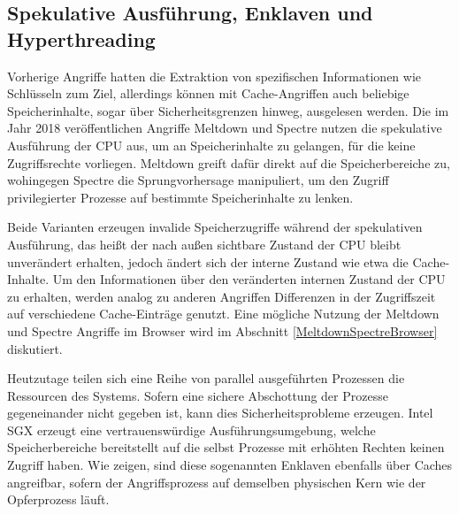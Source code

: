 

\subsection{Spekulative Ausführung, Enklaven und Hyperthreading}


Vorherige Angriffe hatten die Extraktion von spezifischen Informationen wie Schlüsseln zum Ziel, allerdings können mit Cache-Angriffen auch beliebige Speicherinhalte, sogar über Sicherheitsgrenzen hinweg, ausgelesen werden.
Die im Jahr 2018 veröffentlichen Angriffe Meltdown \cite{MeltdownPaper} und Spectre \cite{SpectrePaper} nutzen die spekulative Ausführung der CPU aus, um an Speicherinhalte zu gelangen, für die keine Zugriffsrechte vorliegen.
Meltdown greift dafür direkt auf die Speicherbereiche zu, wohingegen Spectre die Sprungvorhersage manipuliert, um den Zugriff privilegierter Prozesse auf bestimmte Speicherinhalte zu lenken.

Beide Varianten erzeugen invalide Speicherzugriffe während der spekulativen Ausführung, das heißt der nach außen sichtbare Zustand der CPU bleibt unverändert erhalten, jedoch ändert sich der interne Zustand wie etwa die Cache-Inhalte.
Um den Informationen über den veränderten internen Zustand der CPU zu erhalten, werden analog zu anderen Angriffen Differenzen in der Zugriffszeit auf verschiedene Cache-Einträge genutzt.
Eine mögliche Nutzung der Meltdown und Spectre Angriffe im Browser wird im Abschnitt \ref{MeltdownSpectreBrowser} diskutiert.

Heutzutage teilen sich eine Reihe von parallel ausgeführten Prozessen die Ressourcen des Systems.
Sofern eine sichere Abschottung der Prozesse gegeneinander nicht gegeben ist, kann dies Sicherheitsprobleme erzeugen.
Intel SGX erzeugt eine vertrauenswürdige Ausführungsumgebung, welche Speicherbereiche bereitstellt auf die selbst Prozesse mit erhöhten Rechten keinen Zugriff haben.
Wie \cite{CacheZoom,CacheAttacksIntelSGX} zeigen, sind diese sogenannten Enklaven ebenfalls über Caches angreifbar, sofern der Angriffsprozess auf demselben physischen Kern wie der Opferprozess läuft.

